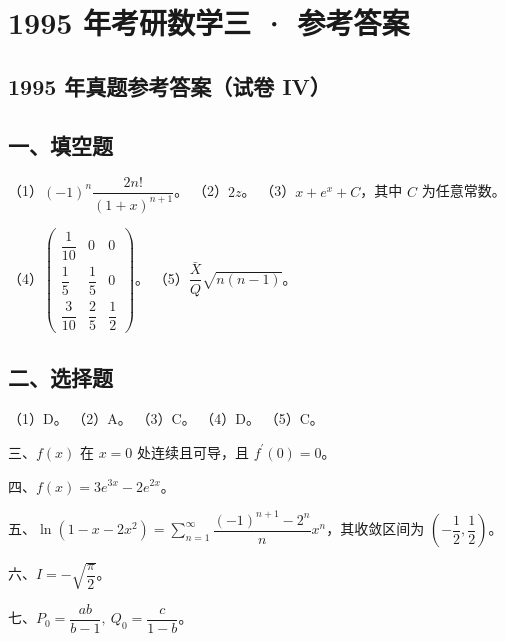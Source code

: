 \documentclass[UTF8,12pt]{ctexart}
\begin{document}
\section*{1995 年考研数学三 · 参考答案}
\subsection*{1995 年真题参考答案（试卷 IV）}

\subsection*{一、填空题}

（1）\(\displaystyle (-1)^n\dfrac{\displaystyle 2n!}{\displaystyle (1+x)^{n+1}}\)。 （2）\(\displaystyle 2z\)。 （3）\(\displaystyle x+e^x+C\)，其中 \(\displaystyle C\) 为任意常数。


（4）\(\displaystyle \begin{pmatrix}\dfrac{\displaystyle 1}{\displaystyle 10}&0&0\\\dfrac{\displaystyle 1}{\displaystyle 5}&\dfrac{\displaystyle 1}{\displaystyle 5}&0\\\dfrac{\displaystyle 3}{\displaystyle 10}&\dfrac{\displaystyle 2}{\displaystyle 5}&\dfrac{\displaystyle 1}{\displaystyle 2}\end{pmatrix}\)。 （5）\(\displaystyle \dfrac{\displaystyle \bar X}{\displaystyle Q}\sqrt{n(n-1)}\)。


\subsection*{二、选择题}

（1）D。 （2）A。 （3）C。 （4）D。 （5）C。


三、\(\displaystyle f(x)\) 在 \(\displaystyle x=0\) 处连续且可导，且 \(\displaystyle f^{\prime}(0)=0\)。


四、\(\displaystyle f(x)=3e^{3x}-2e^{2x}\)。


五、\(\displaystyle \ln(1-x-2x^2)=\displaystyle \sum_{n=1}^{\infty}\dfrac{\displaystyle (-1)^{n+1}-2^n}{\displaystyle n}x^n\)，其收敛区间为 \(\displaystyle (-\dfrac{\displaystyle 1}{\displaystyle 2},\allowbreak \dfrac{\displaystyle 1}{\displaystyle 2})\)。


六、\(\displaystyle I=-\sqrt{\dfrac{\displaystyle \pi}{\displaystyle 2}}\)。


七、\(\displaystyle P_0=\dfrac{\displaystyle ab}{\displaystyle b-1},\allowbreak \ Q_0=\dfrac{\displaystyle c}{\displaystyle 1-b}\)。
\end{document}
